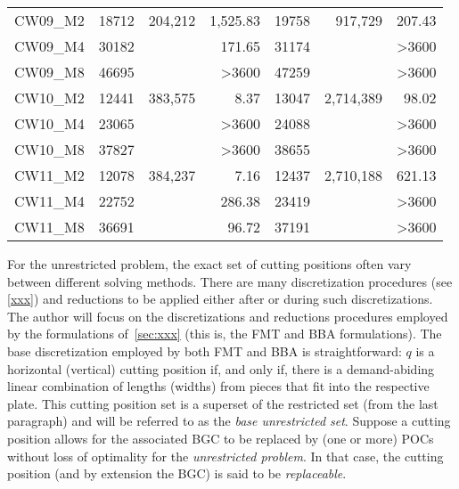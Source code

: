 \documentclass[ppgc,tese,english,formais,babel]{iiufrgs}
\newcommand{\ditto}{\textquotedbl}
\begin{document}
\begin{table}
\begin{tabular}{lrrrrrr}
CW09\_M2 & 18712 & 204,212 & 1,525.83 & 19758 & 917,729 & 207.43 \\
\rowcolor{gray-inner-row} CW09\_M4 & 30182 & \ditto & 171.65 & 31174 & \ditto & >3600 \\
\rowcolor{gray-table-row} CW09\_M8 & 46695 & \ditto & >3600 & 47259 & \ditto & >3600 \\
CW10\_M2 & 12441 & 383,575 & 8.37 & 13047 & 2,714,389 & 98.02 \\
\rowcolor{gray-inner-row} CW10\_M4 & 23065 & \ditto & >3600 & 24088 & \ditto & >3600 \\
\rowcolor{gray-table-row} CW10\_M8 & 37827 & \ditto & >3600 & 38655 & \ditto & >3600 \\
CW11\_M2 & 12078 & 384,237 & 7.16 & 12437 & 2,710,188 & 621.13 \\
\rowcolor{gray-inner-row} CW11\_M4 & 22752 & \ditto & 286.38 & 23419 & \ditto & >3600 \\
\rowcolor{gray-table-row} CW11\_M8 & 36691 & \ditto & 96.72 & 37191 & \ditto & >3600 \\\hline\hline
\end{tabular}
\legend{}
\end{table}

For the unrestricted problem, the exact set of cutting positions often vary between different solving methods.
There are many discretization procedures (see \cref{xxx}) and reductions to be applied either after or during such discretizations.
The author will focus on the discretizations and reductions procedures employed by the formulations of~\cref{sec:xxx} (this is, the FMT and BBA formulations).
The base discretization employed by both FMT and BBA is straightforward: \(q\) is a horizontal (vertical) cutting position if, and only if, there is a demand-abiding linear combination of lengths (widths) from pieces that fit into the respective plate.
This cutting position set is a superset of the restricted set (from the last paragraph) and will be referred to as the \emph{base unrestricted set}.
Suppose a cutting position allows for the associated BGC to be replaced by (one or more) POCs without loss of optimality for the \emph{unrestricted problem}.
In that case, the cutting position (and by extension the BGC) is said to be \emph{replaceable}.
\end{document}
